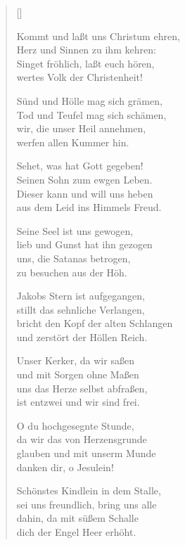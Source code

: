 \begin{multicols}{2}
\settowidth{\versewidth}{Kommt und laßt uns Christum ehren,}
\begin{verse}[\versewidth]
 
 Kommt und laßt uns Christum ehren,\\
Herz und Sinnen zu ihm kehren:\\
Singet fröhlich, laßt euch hören,\\
wertes Volk der Christenheit!
 
 Sünd und Hölle mag sich grämen,\\
Tod und Teufel mag sich schämen,\\
wir, die unser Heil annehmen,\\
werfen allen Kummer hin.
 
 Sehet, was hat Gott gegeben!\\
Seinen Sohn zum ewgen Leben.\\
Dieser kann und will uns heben\\
aus dem Leid ins Himmels Freud.
 
 Seine Seel ist uns gewogen,\\
lieb und Gunst hat ihn gezogen\\
uns, die Satanas betrogen,\\
zu besuchen aus der Höh.
 
 Jakobs Stern ist aufgegangen,\\
stillt das sehnliche Verlangen,\\
bricht den Kopf der alten Schlangen\\
und zerstört der Höllen Reich.
 
 Unser Kerker, da wir saßen\\
und mit Sorgen ohne Maßen\\
uns das Herze selbst abfraßen,\\
ist entzwei und wir sind frei.
 
 O du hochgesegnte Stunde,\\
da wir das von Herzensgrunde\\
glauben und mit unserm Munde\\
danken dir, o Jesulein!
 
 Schönstes Kindlein in dem Stalle,\\
sei uns freundlich, bring uns alle\\
dahin, da mit süßem Schalle\\
dich der Engel Heer erhöht.
   
\end{verse}
\end{multicols}
